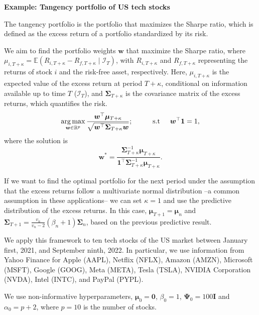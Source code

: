 \begin{enumerate}
\textbf{Example: Tangency portfolio of US tech stocks}

The tangency portfolio is the portfolio that maximizes the Sharpe ratio, which is defined as the excess return of a portfolio standardized by its risk.

We aim to find the portfolio weights \( \bm{w} \) that maximize the Sharpe ratio, where \( \mu_{i,T+\kappa} = \mathbb{E}\left( R_{i,T+\kappa} - R_{f,T+\kappa} \mid \mathcal{I}_T \right) \), with \( R_{i,T+\kappa} \) and \( R_{f,T+\kappa} \) representing the returns of stock \( i \) and the risk-free asset, respectively. Here, \( \mu_{i,T+\kappa} \) is the expected value of the excess return at period \( T+\kappa \), conditional on information available up to time \( T \) (\( \mathcal{I}_T \)), and \( \bm{\Sigma}_{T+\kappa} \) is the covariance matrix of the excess returns, which quantifies the risk.
\begin{equation*}
	\operatorname*{arg\,max}_{{\bm w}\in \mathbb{R}^{p}} \frac{{\bm w}^{\top}\bm{\mu}_{T+\kappa}}{\sqrt{{\bm w}^{\top}{\bm{\Sigma}}_{T+\kappa} {\bm w}}}; \hspace{1cm} \text{s.t}\hspace{.5cm} {\bm w}^{\top}{\bm{1}}=1,
\end{equation*}
where the solution is
\begin{equation*}
	{\bm w}^*=\frac{{\bm{\Sigma}}^{-1}_{T+\kappa}\bm{\mu}_{T+\kappa}}{{\bm{1}}^{\top}{\bm \Sigma}^{-1}_{T+\kappa}\bm{\mu}_{T+\kappa}}.
\end{equation*}

If we want to find the optimal portfolio for the next period under the assumption that the excess returns follow a multivariate normal distribution --a common assumption in these applications-- we can set \( \kappa = 1 \) and use the predictive distribution of the excess returns. In this case, \( \bm{\mu}_{T+1} = \bm{\mu}_n \) and \( \bm{\Sigma}_{T+1} = \frac{v_n}{v_n - 2} (\beta_n + 1) \bm{\Sigma}_n \), based on the previous predictive result.

We apply this framework to ten tech stocks of the US market between January first, 2021, and September ninth, 2022. In particular, we use information from Yahoo Finance for Apple (AAPL), Netflix (NFLX), Amazon (AMZN), Microsoft (MSFT), Google (GOOG), Meta (META), Tesla (TSLA), NVIDIA Corporation (NVDA), Intel (INTC), and PayPal (PYPL).

We use non-informative hyperparameters, $\boldsymbol{\mu}_0=\boldsymbol{0}$, $\beta_0=1$, $\boldsymbol{\Psi}_0=100\boldsymbol{I}$ and $\alpha_0=p+2$, where $p=10$ is the number of stocks.


\end{enumerate}
